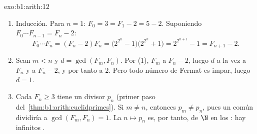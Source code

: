 \begin{solution}{exo:b1:arith:12}
\begin{enumerate}
  \item Inducción. Para $n = 1$: $F_0 = 3 = F_1 - 2 = 5 - 2$.
        Suponiendo $F_0\cdots F_{n-1} = F_n - 2$:
        \[
        F_0 \cdots F_n = (F_n - 2)F_n
        = \bigl(2^{2^n} - 1\bigr)\bigl(2^{2^n} + 1\bigr)
        = 2^{2^{n+1}} - 1 = F_{n+1} - 2 .
        \]
  \item Sean $m < n$ y $d = \gcd(F_m, F_n)$. Por (1), $F_m$
         a $F_n - 2$, luego $d$  a la vez a $F_n$ y a
        $F_n - 2$, y por tanto  a $2$. Pero todo número de
        Fermat es impar, luego $d = 1$.
  \item Cada $F_n \geq 3$ tiene un divisor  $p_n$ (primer paso
        del~\cref{thm:b1:arith:euclidprimes}). Si $m \neq n$, entonces
        $p_m \neq p_n$, pues un  común dividiría a
        $\gcd(F_m, F_n) = 1$. La  $n \mapsto p_n$ es, por
        tanto,  de $\N$ en los : hay infinitos
        .
\end{enumerate}
\end{solution}

